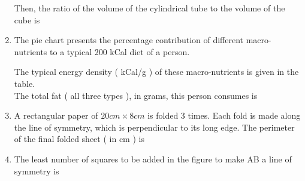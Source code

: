 \documentclass[journal]{IEEEtran}
\begin{document}
\begin{enumerate}
		Then, the ratio of the volume of the cylindrical tube to the volume of the cube is
		\begin{enumerate}
		\end{enumerate}
	\item The pie chart presents the percentage contribution of different macro-nutrients to a typical 200 kCal diet of a person. \\
		\begin{figure}[H]
			\centering
			
		\end{figure}
		The typical energy density ( kCal/g ) of these macro-nutrients is given in the table. \\
		
		The total fat ( all three types ), in grams, this person consumes is
		\begin{enumerate}
				\begin{multicols}{4}
				\item 44.4
				\item 77.8
				\item 100
				\item 3,600
				\end{multicols}
		\end{enumerate}
	\item A rectangular paper of $20 cm \times 8 cm$ is folded 3 times. Each fold is made along the line of symmetry, which is perpendicular to its long edge. The perimeter of the final folded sheet ( in cm ) is
		\begin{enumerate}
				\begin{multicols}{4}
				\item 18
				\item 24
				\item 20
				\item 21
				\end{multicols}
		\end{enumerate}
	\item The least number of squares to be added in the figure to make AB a line of symmetry is 
		\begin{figure}[H]
			\centering
			
		\end{figure}

\end{enumerate}
\end{document}
